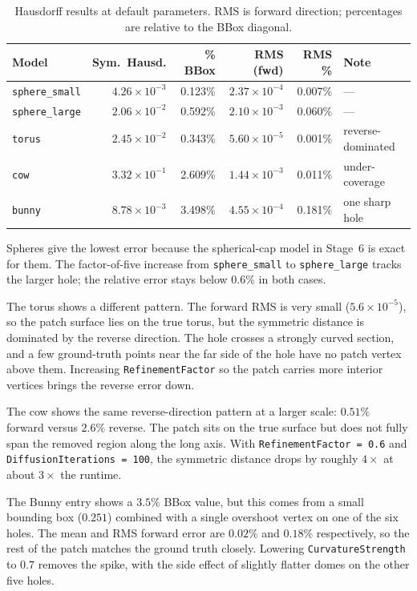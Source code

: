 \begin{table}[H]
\centering
\caption{Hausdorff results at default parameters. RMS is forward direction; percentages are relative to the BBox diagonal.}
\label{tab:main-results}
\begin{tabularx}{\textwidth}{l r r r r X}
\toprule
\textbf{Model} & \textbf{Sym.\ Hausd.} & \textbf{\% BBox} & \textbf{RMS (fwd)} & \textbf{RMS \%} & \textbf{Note} \\
\midrule
\texttt{sphere\_small} & $4.26 \times 10^{-3}$ & 0.123\% & $2.37 \times 10^{-4}$ & 0.007\% & --- \\
\texttt{sphere\_large} & $2.06 \times 10^{-2}$ & 0.592\% & $2.10 \times 10^{-3}$ & 0.060\% & --- \\
\texttt{torus}         & $2.45 \times 10^{-2}$ & 0.343\% & $5.60 \times 10^{-5}$ & 0.001\% & reverse-dominated \\
\texttt{cow}           & $3.32 \times 10^{-1}$ & 2.609\% & $1.44 \times 10^{-3}$ & 0.011\% & under-coverage \\
\texttt{bunny}         & $8.78 \times 10^{-3}$ & 3.498\% & $4.55 \times 10^{-4}$ & 0.181\% & one sharp hole \\
\bottomrule
\end{tabularx}
\end{table}

Spheres give the lowest error because the spherical-cap model in Stage~6 is exact for them. The factor-of-five increase from \texttt{sphere\_small} to \texttt{sphere\_large} tracks the larger hole; the relative error stays below 0.6\% in both cases.

The torus shows a different pattern. The forward RMS is very small ($5.6 \times 10^{-5}$), so the patch surface lies on the true torus, but the symmetric distance is dominated by the reverse direction. The hole crosses a strongly curved section, and a few ground-truth points near the far side of the hole have no patch vertex above them. Increasing \texttt{RefinementFactor} so the patch carries more interior vertices brings the reverse error down.

The cow shows the same reverse-direction pattern at a larger scale: $0.51\%$ forward versus $2.6\%$ reverse. The patch sits on the true surface but does not fully span the removed region along the long axis. With \texttt{RefinementFactor = 0.6} and \texttt{DiffusionIterations = 100}, the symmetric distance drops by roughly $4\times$ at about $3\times$ the runtime.

The Bunny entry shows a $3.5\%$ BBox value, but this comes from a small bounding box ($0.251$) combined with a single overshoot vertex on one of the six holes. The mean and RMS forward error are $0.02\%$ and $0.18\%$ respectively, so the rest of the patch matches the ground truth closely. Lowering \texttt{CurvatureStrength} to $0.7$ removes the spike, with the side effect of slightly flatter domes on the other five holes.


